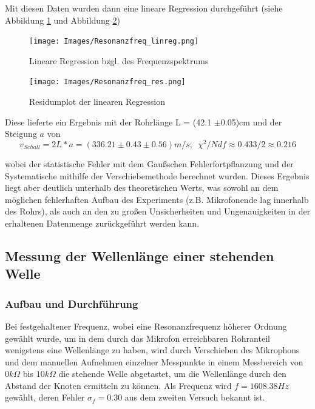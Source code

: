 \documentclass[]{article}
\begin{document}
	\bigskip
	Mit diesen Daten wurden dann eine lineare Regression durchgeführt (siehe Abbildung \ref{linreg_freq} und Abbildung \ref{linreg_res})
	\begin{figure}
		\begin{center}
			\texttt{[image: Images/Resonanzfreq\_linreg.png]}
			\caption{Lineare Regression bzgl. des Frequenzspektrums}
			\label{linreg_freq}
		\end{center}
	\end{figure}
	\begin{figure}
		\begin{center}
			\texttt{[image: Images/Resonanzfreq\_res.png]}
			\caption{Residumplot der linearen Regression}
			\label{linreg_res}
		\end{center}
	\end{figure}

	Diese lieferte ein Ergebnis mit der Rohrlänge L = (42.1 $\pm$0.05)cm und der Steigung $a$ von 
	\begin{equation}
		v_{Schall} = 2L*a = (336.21 \pm 0.43 \pm 0.56) m/s; \, \, \, \chi^2/Ndf \approx 0.433/2 \approx 0.216
	\end{equation}
	
	wobei der statistische Fehler mit dem Gaußschen Fehlerfortpflanzung und der Systematische mithilfe der Verschiebemethode berechnet wurden. Dieses Ergebnis liegt aber deutlich unterhalb des theoretischen Werts, was sowohl an dem möglichen fehlerhaften Aufbau des Experiments (z.B. Mikrofonende lag innerhalb des Rohrs), als auch an den zu großen Unsicherheiten und Ungenauigkeiten in der erhaltenen Datenmenge zurückgeführt werden kann.
	
	\subsection{Messung der Wellenlänge einer stehenden Welle}
	\subsubsection{Aufbau und Durchführung}
	Bei festgehaltener Frequenz, wobei eine Resonanzfrequenz höherer Ordnung gewählt wurde, um in dem durch das Mikrofon erreichbaren Rohranteil wenigstens eine Wellenlänge zu haben, wird durch Verschieben des Mikrophons und dem manuellen Aufnehmen einzelner Messpunkte in einem Messbereich von $0k\Omega$ bis $10k\Omega$ die stehende Welle abgetastet, um die Wellenlänge durch den Abstand der Knoten ermitteln zu können. Als Frequenz wird $f=1608.38Hz$ gewählt, deren Fehler $\sigma_f=0.30$ aus dem zweiten Versuch bekannt ist.
\end{document}
